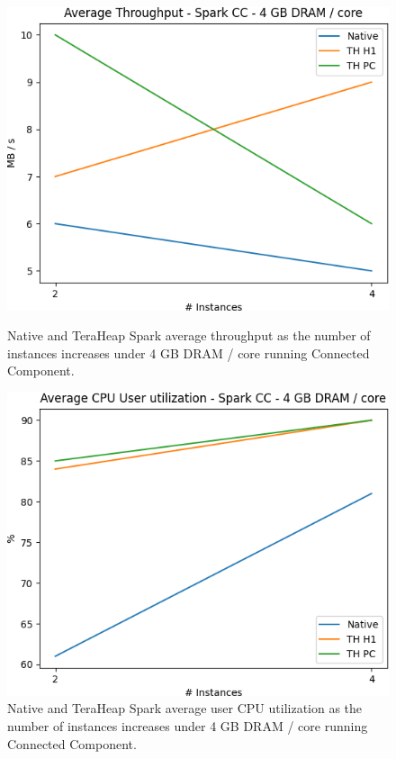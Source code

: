 \begin{figure}[thbp]
	\centering
        \includegraphics[width=\linewidth]{./fig/CC_64_THR.png}
    \caption{Native and TeraHeap Spark average throughput
        as the number of instances increases under 4 GB DRAM / core running Connected Component.}
		\label{fig:cc_64_thr}
        \includegraphics[width=\linewidth]{./fig/CC_64_USR.png}
    \caption{Native and TeraHeap Spark average user CPU utilization
        as the number of instances increases under 4 GB DRAM / core running Connected Component.}
	\label{fig:cc_64_usr}
\end{figure}

